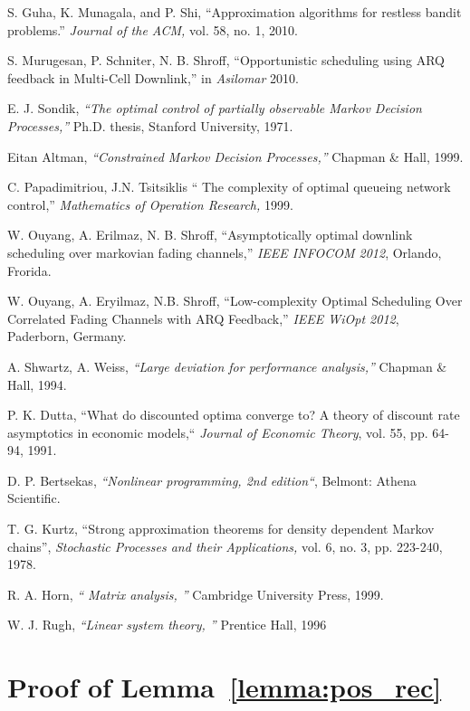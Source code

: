 \documentclass[11pt,twocolumn]{IEEEtran}
\begin{document}
\begin{thebibliography}{1}
S. Guha, K. Munagala, and P. Shi, ``Approximation algorithms for restless bandit problems.'' \emph{Journal of the ACM,} vol. 58, no. 1, 2010.

S. Murugesan, P. Schniter, N. B. Shroff, ``Opportunistic scheduling using ARQ feedback in Multi-Cell Downlink,'' in \emph{Asilomar }2010.

E. J. Sondik, \emph{``The optimal control of partially observable Markov Decision
Processes,''} Ph.D. thesis, Stanford University, 1971.

Eitan Altman, \emph{``Constrained Markov Decision Processes,''} Chapman \& Hall, 1999.

C. Papadimitriou, J.N. Tsitsiklis `` The complexity of
optimal queueing network control,'' \emph{Mathematics of Operation
Research,} 1999.

W. Ouyang, A. Erilmaz, N. B. Shroff, ``Asymptotically optimal downlink scheduling over markovian fading channels,'' \emph{IEEE INFOCOM 2012}, Orlando, Frorida.

W. Ouyang, A. Eryilmaz, N.B. Shroff, ``Low-complexity Optimal Scheduling Over Correlated Fading Channels with ARQ Feedback,''  \emph{IEEE WiOpt 2012}, Paderborn, Germany.

A. Shwartz, A. Weiss, \emph{``Large deviation for performance analysis,''} Chapman \& Hall, 1994.

P. K. Dutta, ``What do discounted optima converge to? A theory of discount rate asymptotics in economic models,`` \emph{Journal of Economic Theory}, vol. 55, pp. 64-94, 1991.

D. P. Bertsekas, \emph{``Nonlinear programming, 2nd edition``}, Belmont: Athena Scientific.

T. G. Kurtz, ``Strong approximation theorems for density dependent Markov chains'', \emph{Stochastic Processes and their Applications,} vol. 6, no. 3, pp. 223-240, 1978.

R. A. Horn, \emph{`` Matrix analysis, ''} Cambridge University Press, 1999.

W. J. Rugh, \emph{``Linear system theory, ''} Prentice Hall, 1996


\end{thebibliography} 
\appendices

\section{Proof of Lemma~\ref{lemma:pos_rec}}
\label{appen:recur}
\end{document}
